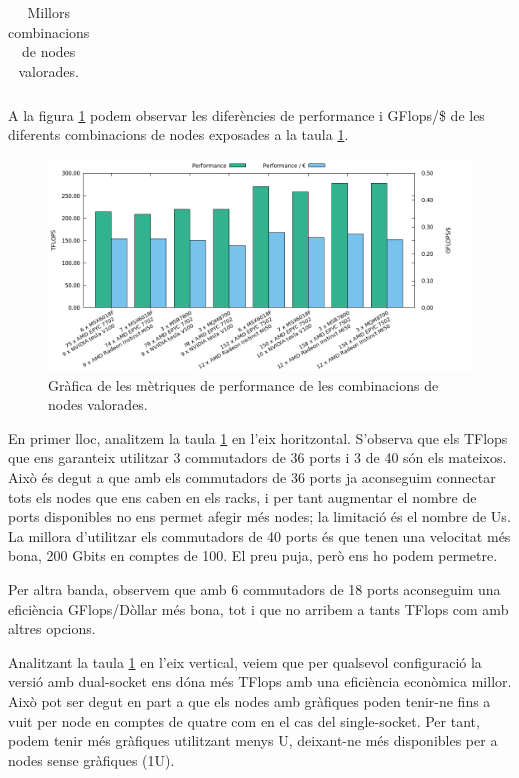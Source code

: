 \begin{table}[H]
\begin{adjustwidth}{-1.0in}{-1.0in}
\begin{center}
\begin{tabular}{llc|c|c|c}
\end{tabular}
\caption{Millors combinacions de nodes valorades.}
    \label{tab:summary}
\end{center}
\end{adjustwidth}
\end{table}

A la figura \ref{fig:summary} podem observar les diferències de performance i GFlops/\$ de les diferents combinacions de nodes exposades a la taula \ref{tab:summary}.
\begin{figure}[h]
    \centering
    \includegraphics[width=\textwidth]{img/summary}
    \caption{Gràfica de les mètriques de performance de les combinacions de nodes valorades.}
    \label{fig:summary}
\end{figure}

En primer lloc, analitzem la taula \ref{tab:summary} en l'eix horitzontal. S'observa que els TFlops que ens garanteix utilitzar 3 commutadors de 36 ports i 3 de 40 són els mateixos. Això és degut a que amb els commutadors de 36 ports ja aconseguim connectar tots els nodes que ens caben en els racks, i per tant augmentar el nombre de ports disponibles no ens permet afegir més nodes; la limitació és el nombre de Us. La millora d'utilitzar els commutadors de 40 ports és que tenen una velocitat més bona, 200 Gbits en comptes de 100. El preu puja, però ens ho podem permetre.

Per altra banda, observem que amb 6 commutadors de 18 ports aconseguim una eficiència GFlops/Dòllar més bona, tot i que no arribem a tants TFlops com amb altres opcions.

Analitzant la taula \ref{tab:summary} en l'eix vertical, veiem que per qualsevol configuració la versió amb dual-socket ens dóna més TFlops amb una eficiència econòmica millor. Això pot ser degut en part a que els nodes amb gràfiques poden tenir-ne fins a vuit per node en comptes de quatre com en el cas del single-socket. Per tant, podem tenir més gràfiques utilitzant menys U, deixant-ne més disponibles per a nodes sense gràfiques (1U).

